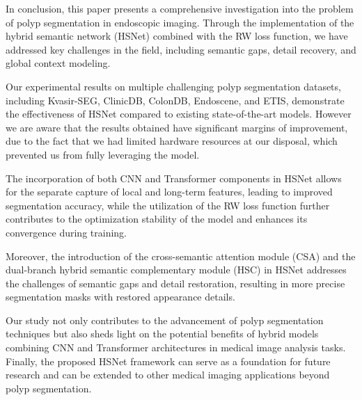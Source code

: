 \documentclass[
	a4paper, %
	10pt, %
	unnumberedsections, %
	twoside, %
]{LTJournalArticle}
\begin{document}
In conclusion, this paper presents a comprehensive investigation into the problem of polyp segmentation in endoscopic imaging. Through the implementation of the hybrid semantic network (HSNet) combined with the RW loss function, we have addressed key challenges in the field, including semantic gaps, detail recovery, and global context modeling.

Our experimental results on multiple challenging polyp segmentation datasets, including Kvasir-SEG, ClinicDB, ColonDB, Endoscene, and ETIS, demonstrate the effectiveness of HSNet compared to existing state-of-the-art models. However we are aware that the results obtained have significant margins of improvement, due to the fact that we had limited hardware resources at our disposal, which prevented us from fully leveraging the model. 

The incorporation of both CNN and Transformer components in HSNet allows for the separate capture of local and long-term features, leading to improved segmentation accuracy, while the utilization of the RW loss function further contributes to the optimization stability of the model and enhances its convergence during training.

Moreover, the introduction of the cross-semantic attention module (CSA) and the dual-branch hybrid semantic complementary module (HSC) in HSNet addresses the challenges of semantic gaps and detail restoration, resulting in more precise segmentation masks with restored appearance details.

Our study not only contributes to the advancement of polyp segmentation techniques but also sheds light on the potential benefits of hybrid models combining CNN and Transformer architectures in medical image analysis tasks. Finally, the proposed HSNet framework can serve as a foundation for future research and can be extended to other medical imaging applications beyond polyp segmentation.
\end{document}
